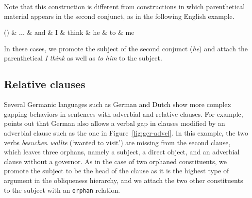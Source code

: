 \documentclass[11pt]{article}
\newenvironment{myquote}%
  {\list{}{\leftmargin=0.0in\rightmargin=0.0in}\item[]}%
  {\endlist}
\newcounter{excounter}
\begin{document}
Note that this construction is different from constructions in which parenthetical material \cite{Pollard1994}
appears in the second conjunct, as in the following English example.

\begin{exe}
\footnotesize
  \setcounter{xnumi}{\value{excounter}}
\end{exe}
\begin{myquote}
  \label{ex:en-gap-10}
  \footnotesize
  \begin{dependency}[edge unit distance=2.5ex]
    \begin{deptext}[column sep=0.4cm]
      (\theexcounter) \& ... \& and \& I \& think \& he \& to \& me \\
    \end{deptext}
  \end{dependency}
\end{myquote}
In these cases, we promote the subject of the second conjunct (\textit{he}) 
and attach the parenthetical \textit{I think} as well as \textit{to him} to the subject.


\subsection{Relative clauses}


Several Germanic languages such as German and Dutch show more complex gapping behaviors in sentences with adverbial and relative clauses. For example,  points out that German also allows a verbal gap in clauses modified by an adverbial clause such as the one in Figure~\ref{fig:ger-advcl}. In this example, the two verbs \textit{besuchen wollte} (`wanted to visit') are missing from the second clause, which leaves three orphans, namely a subject, a direct object, and an adverbial clause without a governor. As in the case of two orphaned constituents, we promote the subject to be the head of the clause as it is the highest type of argument in the obliqueness hierarchy, and we attach the two other constituents to the subject with an \texttt{orphan} relation.
\end{document}
